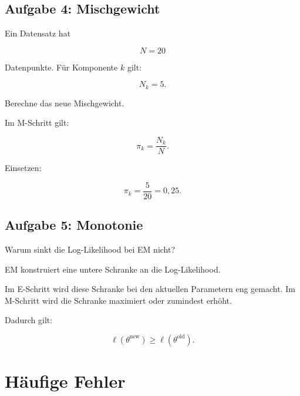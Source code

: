 \subsection{Aufgabe 4: Mischgewicht}

Ein Datensatz hat

\[
    N=20
\]

Datenpunkte.
Für Komponente \(k\) gilt:

\[
    N_k=5.
\]

Berechne das neue Mischgewicht.

\begin{examplebox}
Im M-Schritt gilt:

\[
    \pi_k
    =
    \frac{N_k}{N}.
\]

Einsetzen:

\[
    \pi_k
    =
    \frac{5}{20}
    =
    0{,}25.
\]
\end{examplebox}

\subsection{Aufgabe 5: Monotonie}

Warum sinkt die Log-Likelihood bei EM nicht?

\begin{examplebox}
EM konstruiert eine untere Schranke an die Log-Likelihood.

Im E-Schritt wird diese Schranke bei den aktuellen Parametern eng gemacht.
Im M-Schritt wird die Schranke maximiert oder zumindest erhöht.

Dadurch gilt:

\[
    \ell(\theta^{\mathrm{new}})
    \geq
    \ell(\theta^{\mathrm{old}}).
\]
\end{examplebox}

\section{Häufige Fehler}

